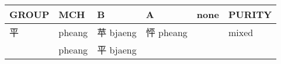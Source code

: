 \documentclass[14pt,a4paper]{scrartcl}
\begin{document}
\begin{longtable}[c]{@{}llllll@{}}
\toprule
\begin{minipage}[b]{0.14\columnwidth}\raggedright\strut
GROUP
\strut\end{minipage} &
\begin{minipage}[b]{0.14\columnwidth}\raggedright\strut
MCH
\strut\end{minipage} &
\begin{minipage}[b]{0.14\columnwidth}\raggedright\strut
B
\strut\end{minipage} &
\begin{minipage}[b]{0.14\columnwidth}\raggedright\strut
A
\strut\end{minipage} &
\begin{minipage}[b]{0.14\columnwidth}\raggedright\strut
none
\strut\end{minipage} &
\begin{minipage}[b]{0.14\columnwidth}\raggedright\strut
PURITY
\strut\end{minipage}\tabularnewline
\midrule
\endhead
\begin{minipage}[t]{0.14\columnwidth}\raggedright\strut
平
\strut\end{minipage} &
\begin{minipage}[t]{0.14\columnwidth}\raggedright\strut
pheang
\strut\end{minipage} &
\begin{minipage}[t]{0.14\columnwidth}\raggedright\strut
苹 bjaeng
\strut\end{minipage} &
\begin{minipage}[t]{0.14\columnwidth}\raggedright\strut
怦 pheang
\strut\end{minipage} &
\begin{minipage}[t]{0.14\columnwidth}\raggedright\strut
\strut\end{minipage} &
\begin{minipage}[t]{0.14\columnwidth}\raggedright\strut
mixed
\strut\end{minipage}\tabularnewline
\begin{minipage}[t]{0.14\columnwidth}\raggedright\strut
𠀒
\strut\end{minipage} &
\begin{minipage}[t]{0.14\columnwidth}\raggedright\strut
pheang
\strut\end{minipage} &
\begin{minipage}[t]{0.14\columnwidth}\raggedright\strut
平 bjaeng
\strut\end{minipage} &
\begin{minipage}[t]{0.14\columnwidth}\raggedright\strut

\end{minipage}
\end{longtable}
\end{document}
